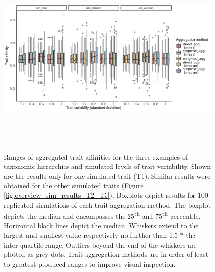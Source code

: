 \documentclass{article}
\begin{document}
\begin{figure}[H]
  \centering
  \includegraphics[width=16.5cm, height=10cm]{Overview_sim_results.png}
  \caption{Ranges of aggregated trait affinities for the three examples of taxonomic hierarchies and simulated levels of trait variability. Shown are the results only for one simulated trait (T1). Similar results were obtained for the other simulated traits (Figure \ref{fig:overview_sim_results_T2_T3}). Boxplots depict results for 100 replicated simulations of each trait aggregation method. The boxplot depicts the median and encompasses the 25\textsuperscript{th} and 75\textsuperscript{th} percentile. Horizontal black lines depict the median. Whiskers extend to the largest and smallest value respectively no further than 1.5 $*$ the inter-quartile range. Outliers beyond the end of the whiskers are plotted as grey dots. Trait aggregation methods are in order of least to greatest produced ranges to improve visual inspection.}
  \label{fig:overview_sim_results}
\end{figure}
\end{document}
